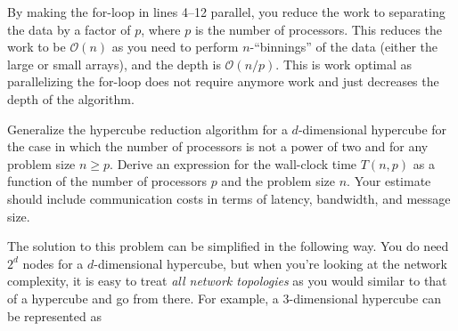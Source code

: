 \documentclass[addpoints]{exam}
\newcommand{\BigO}[1]{\mathcal{O}\left( #1\right)}
\begin{document}
\begin{questions}
\begin{solution}
By making the for-loop in lines 4--12 parallel, you reduce the work to separating the data by a factor of $p$, where $p$ is the number of processors. This reduces the work to be $\BigO{n}$ as you need to perform $n$-``binnings'' of the data (either the large or small arrays), and the depth is $\BigO{n/p}$. This is work optimal as parallelizing the for-loop does not require anymore work and just decreases the depth of the algorithm.
\end{solution}


Generalize the hypercube reduction algorithm for a $d$-dimensional hypercube for the case in which the number of processors is not a power of two and for any problem size $n\geq p$. Derive an expression for the wall-clock time $T(n,p)$ as a function of the number of processors $p$ and the problem size $n$. Your estimate should include communication costs in terms of latency, bandwidth, and message size.

\begin{solution}
The solution to this problem can be simplified in the following way. You do need $2^{d}$ nodes for a $d$-dimensional hypercube, but when you're looking at the network complexity, it is easy to treat {\em all network topologies} as you would similar to that of a hypercube and go from there. For example, a $3$-dimensional hypercube can be represented as

\begin{figure}[H]
  \centering
\end{figure}
\end{solution}
\end{questions}
\end{document}
